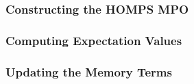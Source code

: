 \subsubsection*{Constructing the HOMPS MPO}

\subsubsection*{Computing Expectation Values}

\subsubsection*{Updating the Memory Terms}

